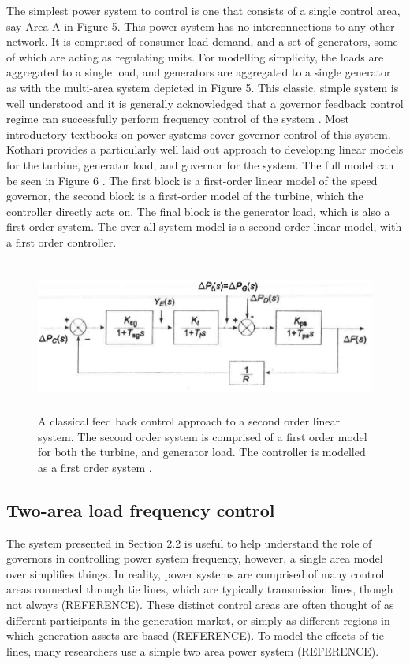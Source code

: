 \documentclass[12pt, a4paper]{article}
\begin{document}
The simplest power system to control is one that consists of a single control area, say Area A in Figure 5. This power system has no interconnections to any other network. It is comprised of consumer load demand, and a set of generators, some of which are acting as regulating units. For modelling simplicity, the loads are aggregated to a single load, and generators are aggregated to a single generator as with the multi-area system depicted in Figure 5. This classic, simple system is well understood and it is generally acknowledged that a governor feedback control regime can successfully perform frequency control of the system \cite{Wood2013, Grainger1994, Kothari2011}. Most introductory textbooks on power systems cover governor control of this system. Kothari provides a particularly well laid out approach to developing linear models for the turbine, generator load, and governor for the system. The full model can be seen in Figure 6 \cite{Kothari2011}. The first block is a first-order linear model of the speed governor, the second block is a first-order model of the turbine, which the controller directly acts on. The final block is the generator load, which is also a first order system. The over all system model is a second order linear model, with a first order controller.

\begin{figure}[h]
\centering
\includegraphics[height=5cm]{single_area_control}
\caption{A classical feed back control approach to a second order linear system. The second order system is comprised of a first order model for both the turbine, and generator load. The controller is modelled as a first order system \cite{Kothari2011}.}
\end{figure}


\subsection{Two-area load frequency control}
The system presented in Section 2.2 is useful to help understand the role of governors in controlling power system frequency, however, a single area model over simplifies things. In reality, power systems are comprised of many control areas connected through tie lines, which are typically transmission lines, though not always (REFERENCE). These distinct control areas are often thought of as different participants in the generation market, or simply as different regions in which generation assets are based (REFERENCE). To model the effects of tie lines, many researchers use a simple two area power system (REFERENCE). 
\end{document}
